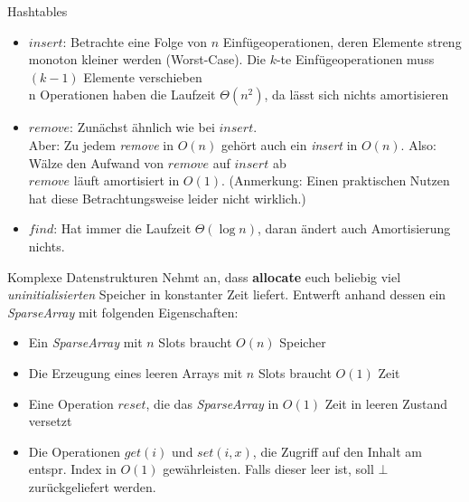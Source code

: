 \begin{frame}{Hashtables}
	\solutionheading
	\begin{itemize}
		\item $insert$: Betrachte eine Folge von $n$ Einfügeoperationen, deren Elemente streng monoton kleiner werden (Worst-Case). Die $k$-te Einfügeoperationen muss $(k-1)$ Elemente verschieben \\
		\impl n Operationen haben die Laufzeit $\Theta(n^2)$, da lässt sich nichts amortisieren
		\pause
		\item $remove$: Zunächst ähnlich wie bei $insert$. \\
		Aber: Zu jedem \emph{remove} in $O(n)$ gehört auch ein \emph{insert} in $O(n)$. Also: Wälze den Aufwand von $remove$ auf $insert$ ab \\ \impl $remove$ läuft amortisiert in $O(1)$. {\small (Anmerkung: Einen praktischen Nutzen hat diese Betrachtungsweise leider nicht wirklich.)}
		\pause
		\item 	$find$: Hat immer die Laufzeit $\Theta(\log n)$, daran ändert auch Amortisierung nichts.
	\end{itemize}
\end{frame}



\begin{frame}{Komplexe Datenstrukturen}
	Nehmt an, dass \textbf{allocate} euch beliebig viel \emph{uninitialisierten} Speicher in konstanter Zeit liefert. Entwerft anhand dessen ein \emph{SparseArray} mit folgenden Eigenschaften: 
	\begin{itemize}
		\item Ein \emph{SparseArray} mit $n$ Slots braucht $O(n)$ Speicher
		\item Die Erzeugung eines leeren Arrays mit $n$ Slots braucht $O(1)$ Zeit
		\item Eine Operation $reset$, die das \emph{SparseArray} in $O(1)$ Zeit in leeren Zustand versetzt
		\item Die Operationen $get(i)$ und $set(i, x)$, die Zugriff auf den Inhalt am entspr. Index in $O(1)$ gewährleisten. Falls dieser leer ist, soll $\bot$ zurückgeliefert werden.
	\end{itemize}
\end{frame}

